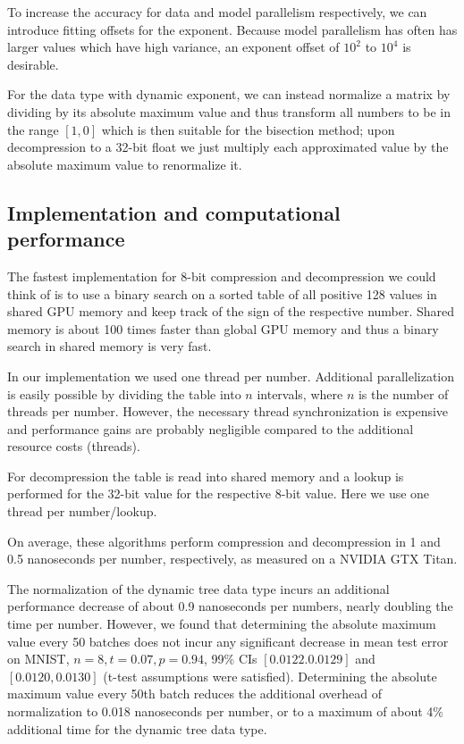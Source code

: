 \documentclass{article} %
\begin{document}
\begin{
	}[htbp]
To increase the accuracy for data and model parallelism respectively, we can introduce fitting offsets for the exponent. Because model parallelism has often has larger values which have high variance, an exponent offset of $10^2$ to $10^4$ is desirable. 

For the data type with dynamic exponent, we can instead normalize a matrix by dividing by its absolute maximum value and thus transform all numbers to be in the range $[1,0]$ which is then suitable for the bisection method; upon decompression to a 32-bit float we just multiply each approximated value by the absolute maximum value to renormalize it. 

\subsection{Implementation and computational performance}

The fastest implementation for 8-bit compression and decompression we could think of is to use a binary search on a sorted table of all positive 128 values in shared GPU memory and keep track of the sign of the respective number. Shared memory is about 100 times faster than global GPU memory and thus a binary search in shared memory is very fast. 

In our implementation we used one thread per number. Additional parallelization is easily possible by dividing the table into $n$ intervals, where $n$ is the number of threads per number. However, the necessary thread synchronization is expensive and performance gains are probably negligible compared to the additional resource costs (threads). 

For decompression the table is read into shared memory and a lookup is performed for the 32-bit value for the respective 8-bit value. Here we use one thread per number/lookup.

On average, these algorithms perform compression and decompression in 1 and 0.5 nanoseconds per number, respectively, as measured on a NVIDIA GTX Titan.

The normalization of the dynamic tree data type incurs an additional performance decrease of about 0.9 nanoseconds per numbers, nearly doubling the time per number. However, we found that determining the absolute maximum value every 50 batches does not incur any significant decrease in mean test error on MNIST, $n=8, t=0.07, p= 0.94$, 99\% CIs $[0.0122.0.0129]$ and $[0.0120,0.0130]$ (t-test assumptions were satisfied). Determining the absolute maximum value every 50th batch reduces the additional overhead of normalization to 0.018 nanoseconds per number, or to a maximum of about 4\% additional time for the dynamic tree data type.


\end{
	}
\end{document}
